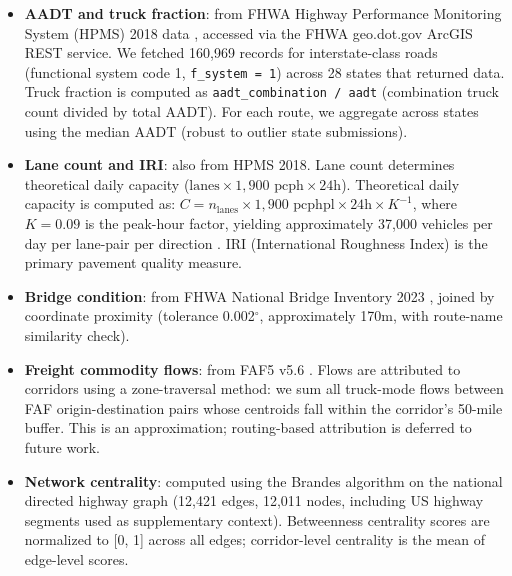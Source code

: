 \begin{itemize}
\item \textbf{AADT and truck fraction}: from FHWA Highway Performance Monitoring System (HPMS) 2018 data \citep{FHWA_HPMS2018}, accessed via the FHWA geo.dot.gov ArcGIS REST service. We fetched 160,969 records for interstate-class roads (functional system code 1, \texttt{f\_system = 1}) across 28 states that returned data. Truck fraction is computed as \texttt{aadt\_combination / aadt} (combination truck count divided by total AADT). For each route, we aggregate across states using the median AADT (robust to outlier state submissions).

\item \textbf{Lane count and IRI}: also from HPMS 2018. Lane count determines theoretical daily capacity ($\text{lanes} \times 1{,}900 \text{ pcph} \times 24\text{h}$). Theoretical daily capacity is computed as: $C = n_{\text{lanes}} \times 1{,}900 \text{ pcphpl} \times 24\text{h} \times K^{-1}$, where $K = 0.09$ is the peak-hour factor, yielding approximately 37{,}000 vehicles per day per lane-pair per direction \citep{HCM7}. IRI (International Roughness Index) is the primary pavement quality measure.

\item \textbf{Bridge condition}: from FHWA National Bridge Inventory 2023 \citep{FHWA_NBI2023}, joined by coordinate proximity (tolerance 0.002$^\circ$, approximately 170m, with route-name similarity check).

\item \textbf{Freight commodity flows}: from FAF5 v5.6 \citep{FAF5_2022}. Flows are attributed to corridors using a zone-traversal method: we sum all truck-mode flows between FAF origin-destination pairs whose centroids fall within the corridor's 50-mile buffer. This is an approximation; routing-based attribution is deferred to future work.

\item \textbf{Network centrality}: computed using the Brandes algorithm \citep{Brandes2001} on the national directed highway graph (12,421 edges, 12,011 nodes, including US highway segments used as supplementary context). Betweenness centrality scores are normalized to [0, 1] across all edges; corridor-level centrality is the mean of edge-level scores.
\end{itemize}

